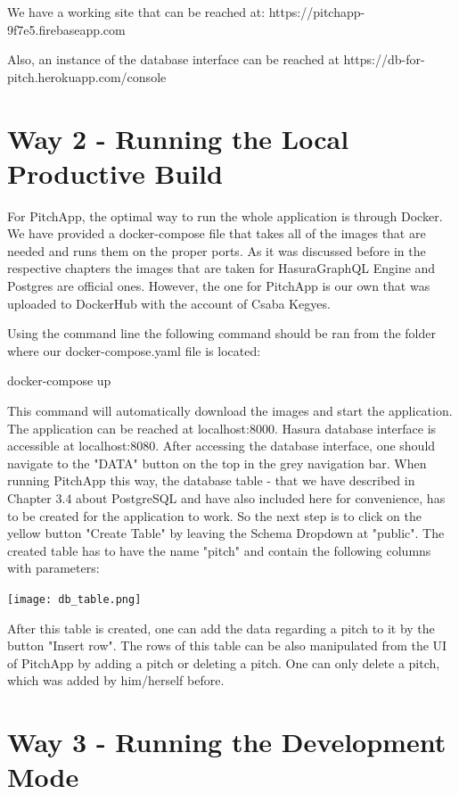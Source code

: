 We have a working site that can be reached at: https://pitchapp-9f7e5.firebaseapp.com

Also, an instance of the database interface can be reached at https://db-for-pitch.herokuapp.com/console

\section{Way 2 - Running the Local Productive Build}

For PitchApp, the optimal way to run the whole application is through Docker. We have provided a docker-compose file that takes all of the images that are needed and runs them on the proper ports. As it was discussed before in the respective chapters the images that are taken for HasuraGraphQL Engine and Postgres are official ones. However, the one for PitchApp is our own that was uploaded to DockerHub with the account of Csaba Kegyes.
 
Using the command line the following command should be ran from the folder where our docker-compose.yaml file is located:

docker-compose up

This command will automatically download the images and start the application. The application can be reached at localhost:8000. Hasura database interface is accessible at localhost:8080. After accessing the database interface, one should navigate to the "DATA" button on the top in the grey navigation bar. When running PitchApp this way, the database table - that we have described in Chapter 3.4 about PostgreSQL and have also included here for convenience, has to be created for the application to work. So the next step is to click on the yellow button "Create Table" by leaving the Schema Dropdown at "public". The created table has to have the name "pitch" and contain the following columns with parameters:

\begin{center}
	\texttt{[image: db\_table.png]}
\end{center}

After this table is created, one can add the data regarding a pitch to it by the button "Insert row". The rows of this table can be also manipulated from the UI of PitchApp by adding a pitch or deleting a pitch. One can only delete a pitch, which was added by him/herself before.


\section{Way 3 - Running the Development Mode}

